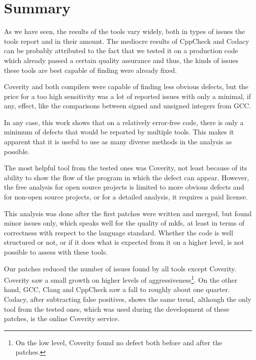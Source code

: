 \section{Summary}\label{chap:results:summary}

As we have seen, the results of the tools vary widely, both in types of issues
the tools report and in their amount.  The mediocre results of CppCheck and
Codacy can be probably attributed to the fact that we tested it on a production
code which already passed a certain quality assurance and thus, the kinds of
issues these tools are best capable of finding were already fixed.

Coverity and both compilers were capable of finding less obvious defects, but
the price for a too high sensitivity was a lot of reported issues with only a
minimal, if any, effect, like the comparisons between signed and unsigned
integers from GCC.

In any case, this work shows that on a relatively error-free code, there is
only a minimum of defects that would be reported by multiple tools. This makes
it apparent that it is useful to use as many diverse methods in the analysis as
possible.

The most helpful tool from the tested ones was Coverity, not least because of
its ability to show the flow of the program in which the defect can appear.
However, the free analysis for open source projects is limited to more obvious
defects and for non-open source projects, or for a detailed analysis, it
requires a paid license.

This analysis was done after the first patches were written and merged, but
found minor issues only, which speaks well for the quality of mkfs, at least in
terms of correctness with respect to the language standard. Whether the code is
well structured or not, or if it does what is expected from it on a higher
level, is not possible to assess with these tools.

Our patches reduced the number of issues found by all tools except
Coverity. Coverity saw a small growth on higher levels of
aggressiveness\footnote{On the low level, Coverity found no defect both
before and after the patches.}. On the other hand, GCC, Clang and CppCheck
saw a fall to roughly about one quarter. Codacy, after subtracting false
positives, shows the same trend, although the only tool from the tested
ones, which was used during the development of these patches, is the online
Coverity service.

